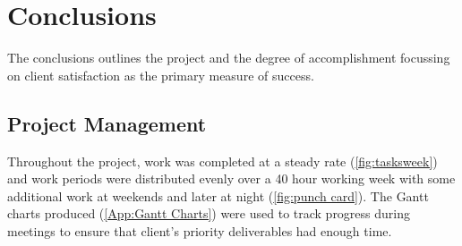 \chapter{Conclusions} \label{Chapter: Conclusions}

\begin{preamble}
	The conclusions outlines the project and the degree of accomplishment focussing on client satisfaction as the primary measure of success.
\end{preamble}


%
%
%
%
%
%

\section{Project Management}

Throughout the project, work was completed at a steady rate (\autoref{fig:tasksweek}) and work periods were distributed evenly over a 40 hour working week with some additional work at weekends and later at night (\autoref{fig:punch card}). The Gantt charts produced (\cref{App:Gantt Charts}) were used to track progress during meetings to ensure that client's priority deliverables had enough time.

